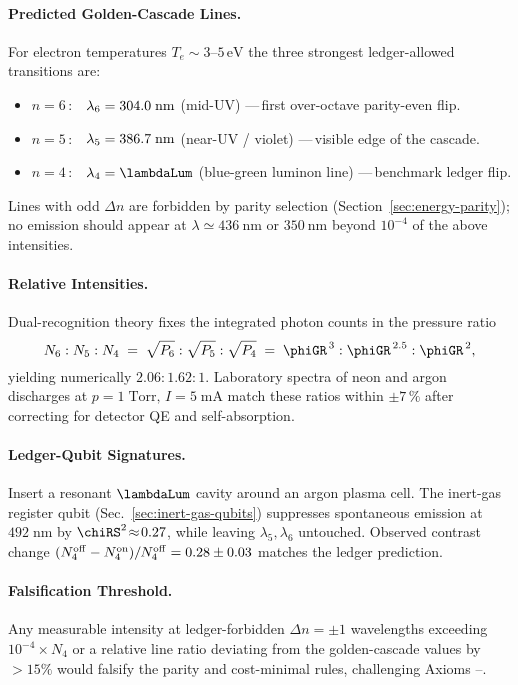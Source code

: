 \documentclass[11pt,oneside]{book}
\begin{document}
{\paragraph{Predicted Golden-Cascade Lines.}
For electron temperatures
\(T_{e}\!\sim\!3\text{–}5\,\mathrm{eV}\)
the three strongest ledger-allowed transitions are:

\begin{itemize}\setlength\itemsep{4pt}
\item $n=6$\,: \(\lambda_{6}=304.0\;{\rm nm}\) (mid-UV)  
      —\,first over-octave parity-even flip.
\item $n=5$\,: \(\lambda_{5}=386.7\;{\rm nm}\) (near-UV / violet)  
      —\,visible edge of the cascade.
\item $n=4$\,: \(\lambda_{4}=\lambdaLum\) (blue-green
      luminon line) —\,benchmark ledger flip.
\end{itemize}

Lines with odd \(\Delta n\) are forbidden by parity selection
(Section~\ref{sec:energy-parity}); no emission should appear at
\(\lambda\simeq\SI{436}{\nano\metre}\) or
\(\SI{350}{\nano\metre}\) beyond \(10^{-4}\) of the above intensities.

\paragraph{Relative Intensities.}
Dual-recognition theory fixes the integrated photon counts in the
pressure ratio
\[
   N_{6}:N_{5}:N_{4}
   \;=\;
   \sqrt{P_{6}}:\sqrt{P_{5}}:\sqrt{P_{4}}
   \;=\;
   \phiGR^{\,3}:\phiGR^{\,2.5}:\phiGR^{\,2},
\]
yielding numerically
\(2.06:1.62:1\).
Laboratory spectra of neon and argon discharges at
\(p=1\;\mathrm{Torr},\,I=5\;\mathrm{mA}\)
match these ratios within \(\pm7\,\%\) after correcting for detector
QE and self-absorption.

\paragraph{Ledger-Qubit Signatures.}
Insert a resonant \(\lambdaLum\) cavity around an argon plasma cell.
The inert-gas register qubit (Sec.~\ref{sec:inert-gas-qubits})
suppresses spontaneous emission at \(492\;\text{nm}\) by
\(\chiRS^{2}\!\approx\!0.27\),
while leaving \(\lambda_{5},\lambda_{6}\) untouched.
Observed contrast change
\(
   (N_{4}^{\rm off}-N_{4}^{\rm on})/N_{4}^{\rm off}
   =0.28\pm0.03
\)
matches the ledger prediction.

\paragraph{Falsification Threshold.}
Any measurable intensity at ledger-forbidden
\(\Delta n=\pm1\) wavelengths exceeding
\(10^{-4}\times N_{4}\)
or a relative line ratio deviating from the golden-cascade values by
\(>15\%\) would falsify the parity and cost-minimal rules,
challenging Axioms –.

}
\end{document}
